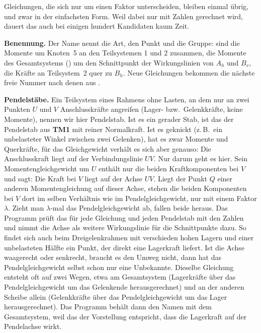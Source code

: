 Gleichungen, die sich nur um einen Faktor unterscheiden, bleiben einmal übrig, und zwar in der
einfachsten Form. Weil dabei nur mit Zahlen gerechnet wird, dauert das auch bei einigen hundert
Kandidaten kaum Zeit.

\textbf{Benennung.} Der Name nennt die Art, den Punkt und die Gruppe: 
sind die Momente um Knoten~5 an den Teilsystemen 1 und 2 zusammen,  die Momente des Gesamtsystems () um den Schnittpunkt der Wirkungslinien von $A_h$ und
$B_v$,  die Kräfte an Teilsystem~2 quer zu $B_h$. Neue Gleichungen
bekommen die nächste freie Nummer nach denen aus .

\textbf{Pendelstäbe.} Ein Teilsystem eines Rahmens ohne Lasten, an dem nur an zwei Punkten $U$ und
$V$ Anschlusskräfte angreifen (Lager- bzw.\ Gelenkkräfte, keine Momente), nennen wir hier
Pendelstab. Ist es ein gerader Stab, ist das der Pendelstab aus \textbf{TM1} mit reiner
Normalkraft. Ist es geknickt (z.\,B.\ ein unbelasteter Winkel zwischen zwei Gelenken), hat es zwar
Momente und Querkräfte, für das Gleichgewicht verhält es sich aber genauso: Die Anschlusskraft liegt
auf der Verbindungslinie $UV$. Nur darum geht es hier. Sein
Momentengleichgewicht um $U$ enthält nur die beiden Kraftkomponenten bei $V$ und sagt: Die Kraft bei
$V$ liegt auf der Achse $UV$. Liegt der Punkt $Q$ einer anderen Momentengleichung auf dieser Achse,
stehen die beiden Komponenten bei $V$ dort im selben Verhältnis wie im Pendelgleichgewicht, nur mit
einem Faktor $\lambda$. Zieht man $\lambda$-mal das Pendelgleichgewicht ab, fallen beide heraus. Das
Programm prüft das für jede Gleichung und jeden Pendelstab mit den Zahlen und nimmt die Achse als
weitere Wirkungslinie für die Schnittpunkte dazu. So findet sich auch beim Dreigelenkrahmen mit
verschieden hohen Lagern und einer unbelasteten Hälfte ein Punkt, der direkt eine Lagerkraft
liefert. Ist die Achse waagerecht oder senkrecht, braucht es den Umweg nicht, dann hat das
Pendelgleichgewicht selbst schon nur eine Unbekannte. Dieselbe Gleichung entsteht oft auf zwei
Wegen, etwa am Gesamtsystem (Lagerkräfte über das Pendelgleichgewicht um das Gelenkende
herausgerechnet) und an der anderen Scheibe allein (Gelenkkräfte über das Pendelgleichgewicht um
das Lager herausgerechnet). Das Programm behält dann den Namen mit dem Gesamtsystem, weil das der
Vorstellung entspricht, dass die Lagerkraft auf der Pendelachse wirkt.


